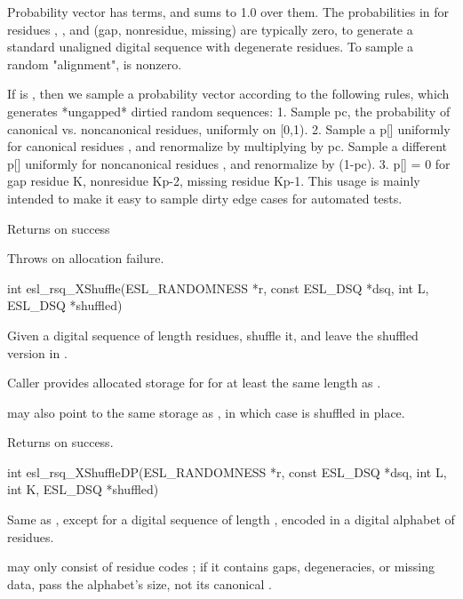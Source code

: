 \begin{sreapi}
Probability vector  has  terms, and sums to 1.0
over them. The probabilities in  for residues ,
, and  (gap, nonresidue, missing) are
typically zero, to generate a standard unaligned digital
sequence with degenerate residues. To sample a random
"alignment",  is nonzero.

If  is , then we sample a probability vector
according to the following rules, which generates
*ungapped* dirtied random sequences:
1. Sample pc, the probability of canonical
vs. noncanonical residues, uniformly on [0,1).
2. Sample a p[] uniformly for canonical residues
, and renormalize by multiplying by pc.
Sample a different p[] uniformly for noncanonical
residues , and renormalize by (1-pc).
3. p[] = 0 for gap residue K, nonresidue Kp-2, 
missing residue Kp-1.
This usage is mainly intended to make it easy to
sample dirty edge cases for automated tests.

Returns  on success

Throws  on allocation failure.


\hypertarget{func:esl_rsq_XShuffle()}
{\item[int esl\_rsq\_XShuffle(ESL\_RANDOMNESS *r, const ESL\_DSQ *dsq, int L, ESL\_DSQ *shuffled)]}

Given a digital sequence  of length  residues,
shuffle it, and leave the shuffled version in .

Caller provides allocated storage for  for at
least the same length as . 

 may also point to the same storage as ,
in which case  is shuffled in place.

Returns  on success.


\hypertarget{func:esl_rsq_XShuffleDP()}
{\item[int esl\_rsq\_XShuffleDP(ESL\_RANDOMNESS *r, const ESL\_DSQ *dsq, int L, int K, ESL\_DSQ *shuffled)]}

Same as , except for a digital
sequence  of length , encoded in a digital alphabet
of  residues. 

 may only consist of residue codes ; if it
contains gaps, degeneracies, or missing data, pass the alphabet's
 size, not its canonical .


\end{sreapi}
